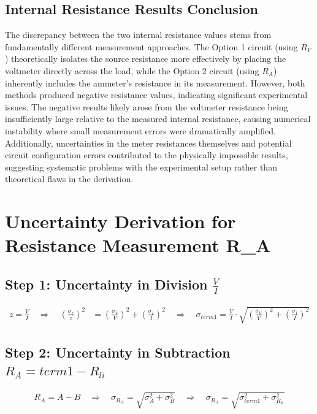 \documentclass{article} %
\begin{document}
\subsection{Internal Resistance Results Conclusion}

The discrepancy between the two internal resistance values stems from fundamentally different measurement approaches. 
The Option 1 circuit (using $R_V$) theoretically isolates the source resistance more effectively by placing the voltmeter directly across the load, while the Option 2 circuit (using $R_A$) inherently includes the ammeter's resistance in its measurement. 
However, both methods produced negative resistance values, indicating significant experimental issues. 
The negative results likely arose from the voltmeter resistance being insufficiently large relative to the measured internal resistance, causing numerical instability where small measurement errors were dramatically amplified. 
Additionally, uncertainties in the meter resistances themselves and potential circuit configuration errors contributed to the physically impossible results, suggesting systematic problems with the experimental setup rather than theoretical flaws in the derivation.
\label{last_page}

\newpage
% 
% 

\appendix

\section{Uncertainty Derivation for Resistance Measurement R\_A}
\label{app:a_RA_uncertainty}

\subsection*{Step 1: Uncertainty in Division $\frac{V}{I}$}
\begin{align*}
z = \frac{V}{I} \quad \Rightarrow \quad \left(\frac{\sigma_z}{z}\right)^2 &= \left(\frac{\sigma_V}{V}\right)^2 + \left(\frac{\sigma_I}{I}\right)^2 \quad \Rightarrow \quad \sigma_{term1} = \frac{V}{I} \cdot \sqrt{\left(\frac{\sigma_V}{V}\right)^2 + \left(\frac{\sigma_I}{I}\right)^2}
\end{align*}

\subsection*{Step 2: Uncertainty in Subtraction $R_A = term1 - R_{li}$}
\begin{align*}
R_A = A - B \quad \Rightarrow \quad \sigma_{R_A} = \sqrt{\sigma_A^2 + \sigma_B^2} \quad \Rightarrow \quad \sigma_{R_A} = \sqrt{\sigma_{term1}^2 + \sigma_{R_{li}}^2}
\end{align*}
\end{document}
